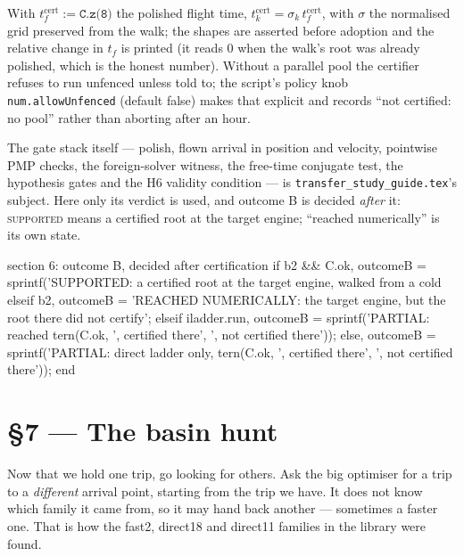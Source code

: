 \documentclass[11pt]{article}
\newcommand{\tf}{t_f}\newcommand{\R}{\mathbb{R}}
\newcommand{\file}[1]{\texttt{#1}}
\begin{document}
\begin{rig}
With $t_f^{\mathrm{cert}}:=\texttt{C.z(8)}$ the polished flight time,
$t_k^{\mathrm{cert}}=\sigma_k\,t_f^{\mathrm{cert}}$, with $\sigma$ the normalised
grid preserved from the walk; the shapes are asserted before adoption and the
relative change in $\tf$ is printed (it reads $0$ when the walk's root was
already polished, which is the honest number). Without a parallel pool the
certifier refuses to run unfenced unless told to; the script's policy knob
\file{num.allowUnfenced} (default false) makes that explicit and records
``not certified: no pool'' rather than aborting after an hour.

The gate stack itself --- polish, flown arrival in position and velocity,
pointwise PMP checks, the foreign-solver witness, the free-time conjugate
test, the hypothesis gates and the H6 validity condition --- is
\file{transfer\_study\_guide.tex}'s subject. Here only its verdict is used,
and outcome B is decided \emph{after} it: \textsc{supported} means a
certified root at the target engine; ``reached numerically'' is its own
state.
\end{rig}

\begin{snippet}{section 6: outcome B, decided after certification}
if b2 && C.ok,       outcomeB = sprintf('SUPPORTED: a certified root at the target engine, walked from a cold %
elseif b2,           outcomeB = 'REACHED NUMERICALLY: the target engine, but the root there did not certify';
elseif iladder.run,  outcomeB = sprintf('PARTIAL: reached %
                                        tern(C.ok, ', certified there', ', not certified there'));
else,                outcomeB = sprintf('PARTIAL: direct ladder only, %
                                        tern(C.ok, ', certified there', ', not certified there'));
end
\end{snippet}

\section{\S7 --- The basin hunt}\label{sec:hunt}

\begin{eli}
Now that we hold one trip, go looking for others. Ask the big optimiser
for a trip to a \emph{different} arrival point, starting from the trip we
have. It does not know which family it came from, so it may hand back
another --- sometimes a faster one. That is how the fast2, direct18 and
direct11 families in the library were found.
\end{eli}
\end{document}
